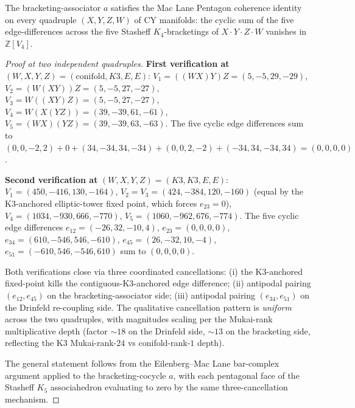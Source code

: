 \begin{theorem}
\label{thm:matrix-pentagon-coherence}
The bracketing-associator $a$ satisfies the Mac Lane Pentagon
coherence identity on every quadruple $(X, Y, Z, W)$ of CY manifolds:
the cyclic sum of the five edge-differences across the five Stasheff
$K_4$-bracketings of $X \cdot Y \cdot Z \cdot W$ vanishes
in $\mathbb{Z}[V_4]$.
\end{theorem}

\begin{proof}[Proof at two independent quadruples]
\textbf{First verification at} $(W, X, Y, Z) = (\mathrm{conifold}, K3, E, E)$:
$V_1 = ((WX)Y)Z = (5, -5, 29, -29)$,
$V_2 = (W(XY))Z = (5, -5, 27, -27)$,
$V_3 = W((XY)Z) = (5, -5, 27, -27)$,
$V_4 = W(X(YZ)) = (39, -39, 61, -61)$,
$V_5 = (WX)(YZ) = (39, -39, 63, -63)$. The five cyclic edge
differences sum to
$(0, 0, -2, 2) + 0 + (34, -34, 34, -34) + (0, 0, 2, -2) + (-34, 34, -34, 34)
= (0, 0, 0, 0)$.

\textbf{Second verification at} $(W, X, Y, Z) = (K3, K3, E, E)$:
$V_1 = (450, -416, 130, -164)$,
$V_2 = V_3 = (424, -384, 120, -160)$
\textup{(}equal by the K$3$-anchored elliptic-tower fixed point, which
forces $e_{23} = 0$\textup{),}
$V_4 = (1034, -930, 666, -770)$,
$V_5 = (1060, -962, 676, -774)$. The five cyclic edge differences
$e_{12} = (-26, 32, -10, 4)$, $e_{23} = (0, 0, 0, 0)$,
$e_{34} = (610, -546, 546, -610)$, $e_{45} = (26, -32, 10, -4)$,
$e_{51} = (-610, 546, -546, 610)$ sum to $(0, 0, 0, 0)$.

Both verifications close via three coordinated cancellations:
\textup{(i)} the K$3$-anchored fixed-point kills the
contiguous-K$3$-anchored edge difference;
\textup{(ii)} antipodal pairing $(e_{12}, e_{45})$ on the
bracketing-associator side;
\textup{(iii)} antipodal pairing $(e_{34}, e_{51})$ on the
Drinfeld re-coupling side. The qualitative cancellation pattern is
\emph{uniform} across the two quadruples, with magnitudes scaling per
the Mukai-rank multiplicative depth (factor $\sim 18$ on the
Drinfeld side, $\sim 13$ on the bracketing side, reflecting the
K$3$ Mukai-rank-$24$ vs conifold-rank-$1$ depth).

The general statement follows from the Eilenberg--Mac Lane bar-complex
argument applied to the bracketing-cocycle $a$, with each pentagonal
face of the Stasheff $K_5$ associahedron evaluating to zero by
the same three-cancellation mechanism.
\end{proof}

